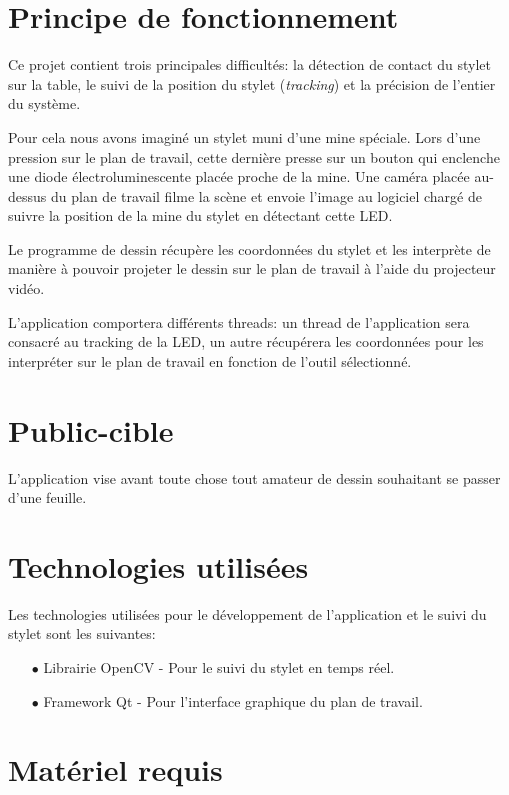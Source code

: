 \documentclass[11pt,a4paper,oldfontcommands]{memoir}
\begin{document}
\newpage

\section{Principe de fonctionnement}

Ce projet contient trois principales difficultés: la détection de contact du stylet sur la table, le suivi de la position du stylet (\textit{tracking}) et la précision de l'entier du système.

Pour cela nous avons imaginé un stylet muni d'une mine spéciale. Lors d'une pression sur le plan de travail, cette dernière presse sur un bouton qui enclenche une diode électroluminescente placée proche de la mine. Une caméra placée au-dessus du plan de travail filme la scène et envoie l'image au logiciel chargé de suivre la position de la mine du stylet en détectant cette LED.

Le programme de dessin récupère les coordonnées du stylet et les interprète de manière à pouvoir projeter le dessin sur le plan de travail à l'aide du projecteur vidéo.

L'application comportera différents threads: un thread de l'application sera consacré au tracking de la LED, un autre récupérera les coordonnées pour les interpréter sur le plan de travail en fonction de l'outil sélectionné.

\section{Public-cible}

L'application vise avant toute chose tout amateur de dessin souhaitant se passer d'une feuille. 

\section{Technologies utilisées}

Les technologies utilisées pour le développement de l'application et le suivi du stylet sont les suivantes:

\begin{itemize}
\item[$\bullet$] Librairie OpenCV - Pour le suivi du stylet en temps réel.
\item[$\bullet$] Framework Qt - Pour l'interface graphique du plan de travail.
\end{itemize}

\section{Matériel requis}
\end{document}
